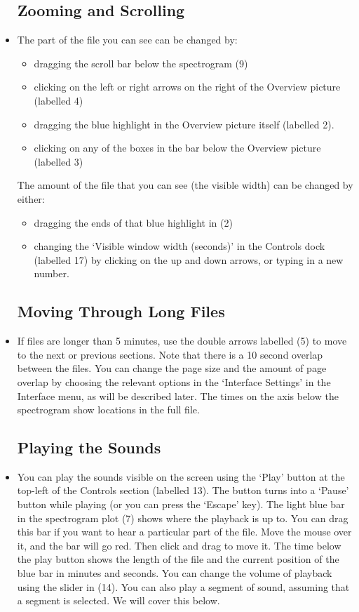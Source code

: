 \documentclass{article}
\begin{document}
\begin{itemize}
\subsection{Zooming and Scrolling}

\item The part of the file you can see can be changed by:
	\begin{itemize}
	\item dragging the scroll bar below the spectrogram (9)
	\item clicking on the left or right arrows on the right of the Overview picture (labelled 4)
	\item dragging the blue highlight in the Overview picture itself (labelled 2). 
	\item clicking on any of the boxes in the bar below the Overview picture (labelled 3)
	\end{itemize}
	The amount of the file that you can see (the visible width) can be changed by either: 
	\begin{itemize}
	\item dragging the ends of that blue highlight in (2)
	\item changing the `Visible window width (seconds)' in the Controls dock (labelled 17) by clicking on the up and down arrows, or typing in a new number.
	\end{itemize}

\subsection{Moving Through Long Files}

\item If files are longer than 5 minutes, use the double arrows labelled (5) to move to the next or previous sections. Note that there is a 10 second overlap between the files. You can change the page size and the amount of page overlap by choosing the relevant options in the `Interface Settings' in the Interface menu, as will be described later. The times on the axis below the spectrogram show locations in the full file.

\subsection{Playing the Sounds}

\item You can play the sounds visible on the screen using the `Play' button at the top-left of the Controls section (labelled 13). The button turns into a `Pause' button while playing (or you can press the `Escape' key). The light blue bar in the spectrogram plot (7)  shows where the playback is up to. You can drag this bar if you want to hear a particular part of the file. Move the mouse over it, and the bar will go red. Then click and drag to move it. The time below the play button shows the length of the file and the current position of the blue bar in minutes and seconds. You can change the volume of playback using the slider in (14). 
You can also play a segment of sound, assuming that a segment is selected. We will cover this below.


\end{itemize}
\end{document}
